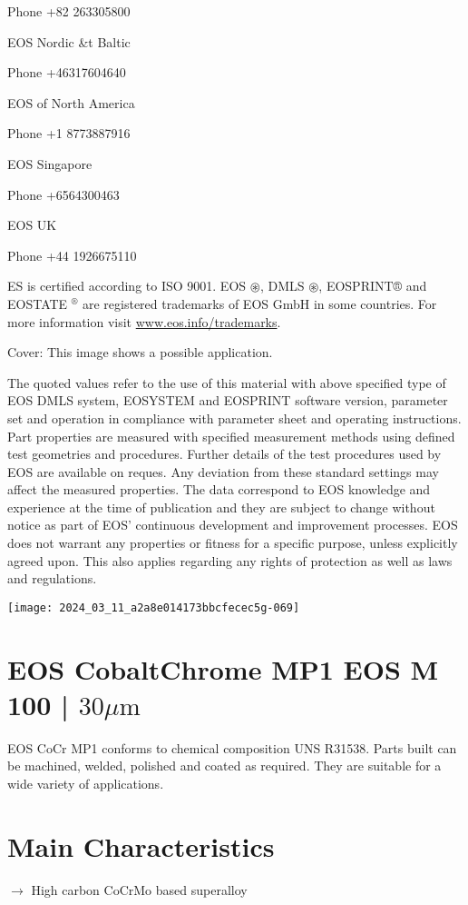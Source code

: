 \documentclass[10pt]{article}
\begin{document}
Phone +82 263305800

EOS Nordic \&t Baltic

Phone +46317604640

EOS of North America

Phone +1 8773887916

EOS Singapore

Phone +6564300463

EOS UK

Phone +44 1926675110

ES is certified according to ISO 9001. EOS $\circledast$, DMLS $\circledast$, EOSPRINT® and EOSTATE ${ }^{\circledR}$ are registered trademarks of EOS GmbH in some countries. For more information visit \href{http://www.eos.info/trademarks}{www.eos.info/trademarks}.

Cover: This image shows a possible application.

The quoted values refer to the use of this material with above specified type of EOS DMLS system, EOSYSTEM and EOSPRINT software version, parameter set and operation in compliance with parameter sheet and operating instructions. Part properties are measured with specified measurement methods using defined test geometries and procedures. Further details of the test procedures used by EOS are available on reques. Any deviation from these standard settings may affect the measured properties. The data correspond to EOS knowledge and experience at the time of publication and they are subject to change without notice as part of EOS' continuous development and improvement processes. EOS does not warrant any properties or fitness for a specific purpose, unless explicitly agreed upon. This also applies regarding any rights of protection as well as laws and regulations.

\begin{center}
\texttt{[image: 2024\_03\_11\_a2a8e014173bbcfecec5g-069]}
\end{center}

\section*{EOS CobaltChrome MP1 EOS M 100 | $30 \mu \mathrm{m}$}
EOS CoCr MP1 conforms to chemical composition UNS R31538. Parts built can be machined, welded, polished and coated as required. They are suitable for a wide variety of applications.

\section*{Main Characteristics}
$\longrightarrow$ High carbon CoCrMo based superalloy
\end{document}
